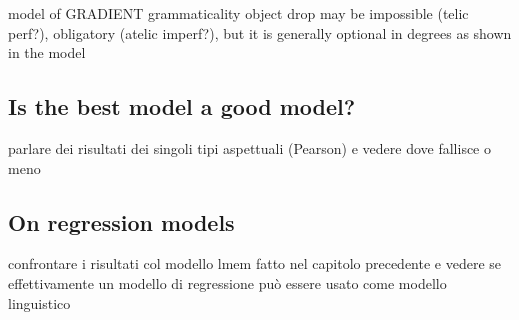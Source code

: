 model of GRADIENT grammaticality
object drop may be impossible (telic perf?), obligatory (atelic imperf?), but it is generally optional in degrees as shown in the model


\subsection{Is the best model a good model?} 

parlare dei risultati dei singoli tipi aspettuali (Pearson) e vedere dove fallisce o meno


\subsection{On regression models} 

confrontare i risultati col modello lmem fatto nel capitolo precedente e vedere se effettivamente un modello di regressione può essere usato come modello linguistico
